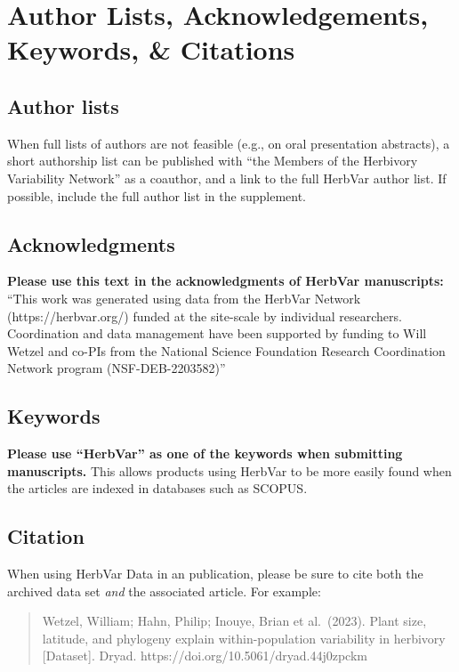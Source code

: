 \documentclass[
  letterpaper,
  oneside,
  open=any]{scrbook}
\begin{document}
\section{Author Lists, Acknowledgements, Keywords, \&
Citations}\label{author-lists-acknowledgements-keywords-citations}

\subsection{Author lists}\label{author-lists}

When full lists of authors are not feasible (e.g., on oral presentation
abstracts), a short authorship list can be published with ``the Members
of the Herbivory Variability Network'' as a coauthor, and a link to the
full HerbVar author list. If possible, include the full author list in
the supplement.

\subsection{Acknowledgments}\label{acknowledgments}

\textbf{Please use this text in the acknowledgments of HerbVar
manuscripts:} ``This work was generated using data from the HerbVar
Network (https://herbvar.org/) funded at the site-scale by individual
researchers. Coordination and data management have been supported by
funding to Will Wetzel and co-PIs from the National Science Foundation
Research Coordination Network program (NSF-DEB-2203582)''

\subsection{Keywords}\label{keywords}

\textbf{Please use ``HerbVar'' as one of the keywords when submitting
manuscripts.} This allows products using HerbVar to be more easily found
when the articles are indexed in databases such as SCOPUS.

\subsection{Citation}\label{citation}

When using HerbVar Data in an publication, please be sure to cite both
the archived data set \emph{and} the associated article. For example:

\begin{quote}
Wetzel, William; Hahn, Philip; Inouye, Brian et al.~(2023). Plant size,
latitude, and phylogeny explain within-population variability in
herbivory {[}Dataset{]}. Dryad. https://doi.org/10.5061/dryad.44j0zpckm
\end{quote}
\end{document}
